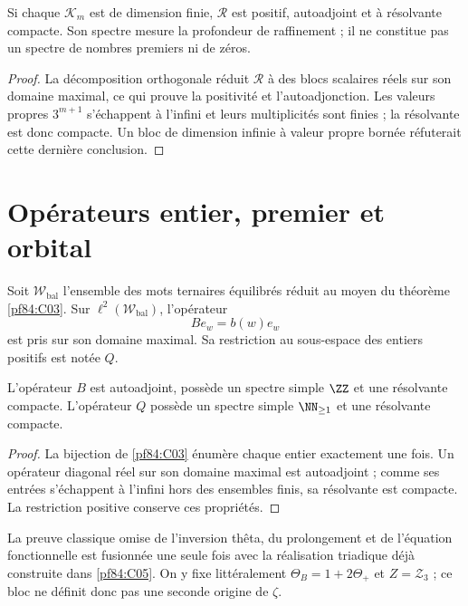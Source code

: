\begin{theorem}
\label{pf84:C02}
Si chaque \(\mathcal K_m\) est de dimension finie, \(\mathcal R\) est positif,
autoadjoint et à résolvante compacte. Son spectre mesure la profondeur de
raffinement ; il ne constitue pas un spectre de nombres premiers ni de zéros.
\end{theorem}

\begin{proof}
La décomposition orthogonale réduit \(\mathcal R\) à des blocs scalaires réels
sur son domaine maximal, ce qui prouve la positivité et l'autoadjonction. Les
valeurs propres \(3^{m+1}\) s'échappent à l'infini et leurs multiplicités sont finies ;
la résolvante est donc compacte. Un bloc de dimension infinie à
valeur propre bornée réfuterait cette dernière conclusion.
\end{proof}

\section{Opérateurs entier, premier et orbital}

Soit \(\mathscr W_{\mathrm{bal}}\) l'ensemble des mots ternaires
équilibrés réduit au moyen du théorème
\cref{pf84:C03}. Sur \(\ell^2(\mathscr W_{\mathrm{bal}})\), l'opérateur
\[
 Be_w=b(w)e_w
\]
est pris sur son domaine maximal. Sa restriction au sous-espace des entiers
positifs est notée \(Q\).

\begin{theorem}
\label{pf84:C04}
L'opérateur \(B\) est autoadjoint, possède un spectre simple \(\ZZ\) et une
résolvante compacte. L'opérateur \(Q\) possède un spectre simple
\(\NN_{\ge1}\) et une résolvante compacte.
\end{theorem}

\begin{proof}
La bijection de \cref{pf84:C03} énumère chaque entier exactement une fois. Un
opérateur diagonal réel sur son domaine maximal est autoadjoint ; comme ses entrées
s'échappent à l'infini hors des ensembles finis, sa résolvante est compacte. La
restriction positive conserve ces propriétés.
\end{proof}

La preuve classique omise de l'inversion thêta, du prolongement et de l'équation
fonctionnelle est fusionnée une seule fois avec la réalisation triadique déjà construite
dans \cref{pf84:C05}. On y fixe littéralement
\(\Theta_B=1+2\Theta_+\) et \(Z=\mathcal Z_3\) ; ce bloc ne
définit donc pas une seconde origine de \(\zeta\).

